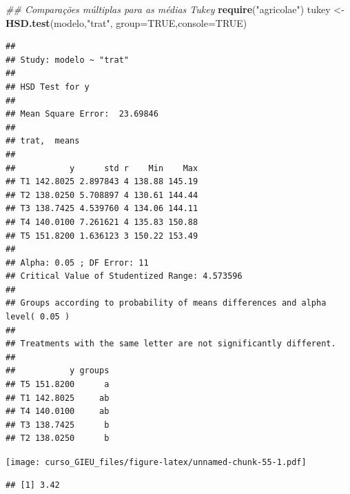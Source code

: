 \documentclass[
]{book}
\newenvironment{Shaded}{\begin{snugshade}}{\end{snugshade}}
\newcommand{\CommentTok}[1]{\textcolor[rgb]{0.56,0.35,0.01}{\textit{#1}}}
\newcommand{\DataTypeTok}[1]{\textcolor[rgb]{0.13,0.29,0.53}{#1}}
\newcommand{\DecValTok}[1]{\textcolor[rgb]{0.00,0.00,0.81}{#1}}
\newcommand{\FloatTok}[1]{\textcolor[rgb]{0.00,0.00,0.81}{#1}}
\newcommand{\KeywordTok}[1]{\textcolor[rgb]{0.13,0.29,0.53}{\textbf{#1}}}
\newcommand{\NormalTok}[1]{#1}
\newcommand{\OperatorTok}[1]{\textcolor[rgb]{0.81,0.36,0.00}{\textbf{#1}}}
\newcommand{\OtherTok}[1]{\textcolor[rgb]{0.56,0.35,0.01}{#1}}
\newcommand{\StringTok}[1]{\textcolor[rgb]{0.31,0.60,0.02}{#1}}
\begin{document}
\begin{Shaded}
\begin{Highlighting}[]
\CommentTok{## Comparações múltiplas para as médias Tukey}
\KeywordTok{require}\NormalTok{(}\StringTok{"agricolae"}\NormalTok{)}
\NormalTok{tukey <-}\StringTok{ }\KeywordTok{HSD.test}\NormalTok{(modelo,}\StringTok{"trat"}\NormalTok{, }\DataTypeTok{group=}\OtherTok{TRUE}\NormalTok{,}\DataTypeTok{console=}\OtherTok{TRUE}\NormalTok{)}
\end{Highlighting}
\end{Shaded}

\begin{verbatim}
## 
## Study: modelo ~ "trat"
## 
## HSD Test for y 
## 
## Mean Square Error:  23.69846 
## 
## trat,  means
## 
##           y      std r    Min    Max
## T1 142.8025 2.897843 4 138.88 145.19
## T2 138.0250 5.708897 4 130.61 144.44
## T3 138.7425 4.539760 4 134.06 144.11
## T4 140.0100 7.261621 4 135.83 150.88
## T5 151.8200 1.636123 3 150.22 153.49
## 
## Alpha: 0.05 ; DF Error: 11 
## Critical Value of Studentized Range: 4.573596 
## 
## Groups according to probability of means differences and alpha level( 0.05 )
## 
## Treatments with the same letter are not significantly different.
## 
##           y groups
## T5 151.8200      a
## T1 142.8025     ab
## T4 140.0100     ab
## T3 138.7425      b
## T2 138.0250      b
\end{verbatim}

\begin{Shaded}
\end{Shaded}

\texttt{[image: curso\_GIEU\_files/figure-latex/unnamed-chunk-55-1.pdf]}

\begin{Shaded}
\end{Shaded}

\begin{verbatim}
## [1] 3.42
\end{verbatim}

  
\end{document}

